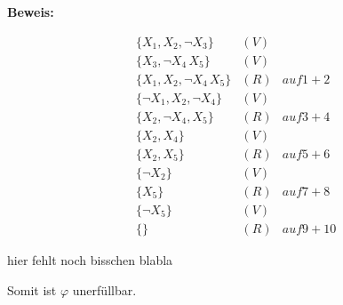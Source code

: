 \documentclass[12pt,a4paper]{scrartcl}
\begin{document}
\noindent
\textbf{Beweis: }

\begin{align}
  & \{X_1, X_2, \neg X_3\} & (V)\\
  & \{X_3, \neg X_4\, X_5\} & (V)\\
  & \{X_1, X_2, \neg X_4\, X_5\} & (R) & auf 1 + 2\\
  & \{\neg X_1, X_2, \neg X_4\} & (V)\\
  & \{X_2, \neg X_4, X_5\} & (R) & auf 3 + 4\\
  & \{X_2, X_4\} & (V)\\
  & \{X_2, X_5\} & (R) & auf 5 + 6\\
  & \{\neg X_2\} & (V)\\
  & \{X_5\} & (R) & auf 7 + 8\\
  & \{\neg X_5\} & (V)\\
  & \{\} & (R) & auf 9 + 10
\end{align}

hier fehlt noch bisschen blabla

Somit ist $\varphi$ unerfüllbar.
\end{document}
